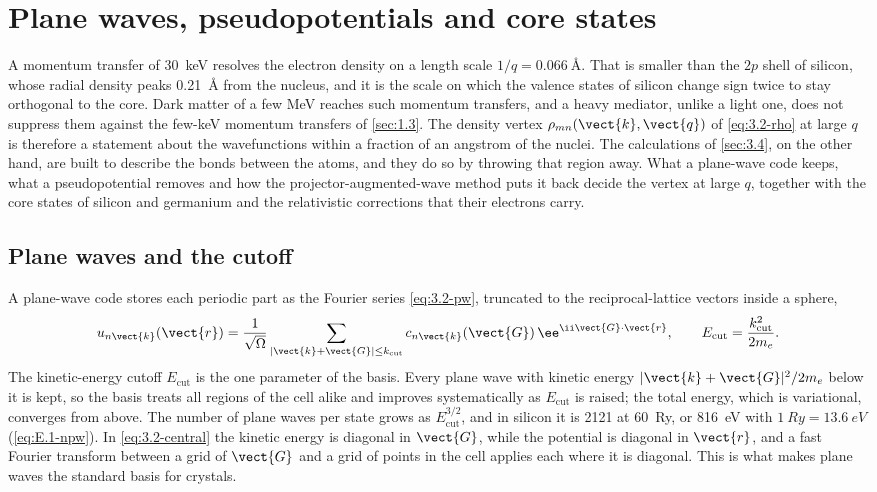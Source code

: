 \section{Plane waves, pseudopotentials and core states}\label{sec:3.5}

A momentum transfer of \SI{30}{keV} resolves the electron density on a length scale $1/q = \SI{0.066}{\angstrom}$. That is smaller than the $2p$ shell of silicon, whose radial density peaks \SI{0.21}{\angstrom} from the nucleus, and it is the scale on which the valence states of silicon change sign twice to stay orthogonal to the core. Dark matter of a few MeV reaches such momentum transfers, and a heavy mediator, unlike a light one, does not suppress them against the few-keV momentum transfers of \cref{sec:1.3}. The density vertex $\rho_{mn}(\vect{k}, \vect{q})$ of \cref{eq:3.2-rho} at large $q$ is therefore a statement about the wavefunctions within a fraction of an angstrom of the nuclei. The calculations of \cref{sec:3.4}, on the other hand, are built to describe the bonds between the atoms, and they do so by throwing that region away. What a plane-wave code keeps, what a pseudopotential removes and how the projector-augmented-wave method puts it back decide the vertex at large $q$, together with the core states of silicon and germanium and the relativistic corrections that their electrons carry.

\subsection{Plane waves and the cutoff}

A plane-wave code stores each periodic part as the Fourier series \cref{eq:3.2-pw}, truncated to the reciprocal-lattice vectors inside a sphere,
\begin{equation}
  u_{n\vect{k}}(\vect{r}) = \frac{1}{\sqrt\Omega}\sum_{|\vect{k}+\vect{G}| \le k_{\mathrm{cut}}}c_{n\vect{k}}(\vect{G})\,\ee^{\ii\vect{G}\cdot\vect{r}}, \qquad
  E_{\mathrm{cut}} = \frac{k_{\mathrm{cut}}^2}{2m_e} .
  \label{eq:3.5-pw}
\end{equation}
The kinetic-energy cutoff $E_{\mathrm{cut}}$ is the one parameter of the basis. Every plane wave with kinetic energy $|\vect{k}+\vect{G}|^2/2m_e$ below it is kept, so the basis treats all regions of the cell alike and improves systematically as $E_{\mathrm{cut}}$ is raised; the total energy, which is variational, converges from above. The number of plane waves per state grows as $E_{\mathrm{cut}}^{3/2}$, and in silicon it is 2121 at \SI{60}{Ry}, or \SI{816}{eV} with $\SI{1}{Ry} = \SI{13.6}{eV}$ (\cref{eq:E.1-npw}). In \cref{eq:3.2-central} the kinetic energy is diagonal in $\vect{G}$, while the potential is diagonal in $\vect{r}$, and a fast Fourier transform between a grid of $\vect{G}$ and a grid of points in the cell applies each where it is diagonal. This is what makes plane waves the standard basis for crystals.


